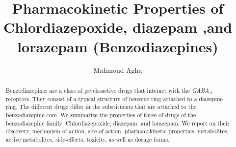 \documentclass[10pt, a4paper]{report}
\author{Mahmoud Agha}
\title{Pharmacokinetic Properties of Chlordiazepoxide, diazepam ,and lorazepam (Benzodiazepines)}
\begin{document}
\maketitle
\tableofcontents
	\begin{abstract}
		Benzodiazepines are a class of psychoactive drugs that interact with the \emph{GABA$_A$} receptors. They consist of a typical structure of benzene ring attached to a diazepine ring. The different drugs differ in the substituents that are attached to the benzodiazepine core. We summarize the properties of three of drugs of the benzodiazepine  family: Chlordiazepoxide, diazepam ,and lorazepam. We report on their discovery, mechanism of action, site of action, pharmacokinetic properties, metabolites, active metabolites, side-effects, toxicity, as well as dosage forms. 
	\end{abstract}




%







 
\end{document}
